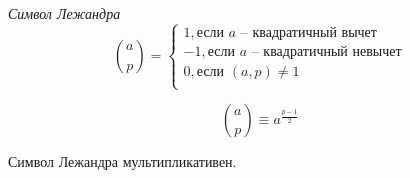 \begin{definition}
    \textit{Символ Лежандра}  
    $$
    \binom{a}{p} = 
    \begin{cases}
        1, \text{если } a \text{ -- квадратичный вычет}\\
        -1, \text{если } a \text{ -- квадратичный невычет}\\
        0, \text{если } (a, p) \neq 1\\
    \end{cases}
    $$
\end{definition}

\begin{note}
    $$
        \binom{a}{p} \equiv a^{ \frac{p - 1}{2} }
    $$
\end{note}

\begin{corollary}
    Символ Лежандра мультипликативен.
\end{corollary}


